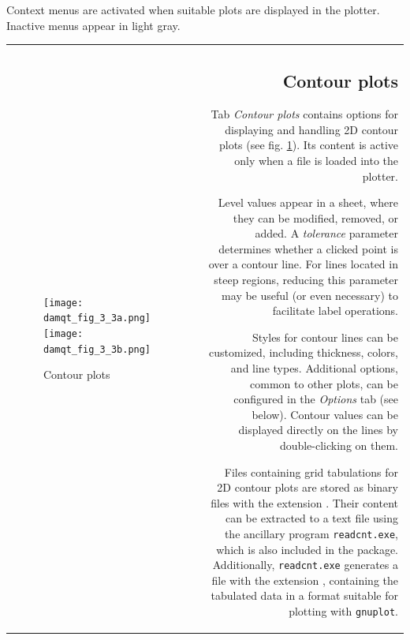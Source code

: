\documentclass[10pt]{article}
\begin{document}
\vspace*{5mm}

Context menus are activated when suitable plots are displayed in the plotter. Inactive menus appear in light gray.   


\begin{tabular}{lr}
\hspace*{-3mm}
\begin{minipage}{.5\linewidth}
\hspace*{-3mm}
\vspace*{4mm}
\begin{figure}[H]
\begin{center}
\vspace*{-5mm}
\texttt{[image: damqt\_fig\_3\_3a.png]}
\texttt{[image: damqt\_fig\_3\_3b.png]}
\end{center}
\caption{Contour plots \label{fig:3_3c}}
\end{figure}
\end{minipage}
&
\begin{minipage}{.5\linewidth}

\subsection{Contour plots \label{sec:3.1}\index{2D graphics!contour plots}}

Tab {\it Contour plots} contains options for displaying and handling 2D contour plots  
(see fig. \ref{fig:3_3c}). Its content is active only when a \cnt{ } file is loaded into the plotter.  

Level values appear in a sheet, where they can be modified, removed, or added.  
A {\it tolerance} parameter determines whether a clicked point is over a contour line.  
For lines located in steep regions, reducing this parameter may be useful  
(or even necessary) to facilitate label operations.  

Styles for contour lines can be customized, including thickness, colors, and line types.  
Additional options, common to other plots, can be configured in the {\it Options} tab (see below).  
Contour values can be displayed directly on the lines by double-clicking on them.  

Files containing grid tabulations for 2D contour plots are stored as binary files  
with the extension \cnt{}. Their content can be extracted to a text file using  
the ancillary program \texttt{readcnt.exe}, which is also included in the package.  
Additionally, \texttt{readcnt.exe} generates a file with the extension \gnu{ },  
containing the tabulated data in a format suitable for plotting with \texttt{gnuplot}.  


\end{minipage}
\end{tabular}
\end{document}
